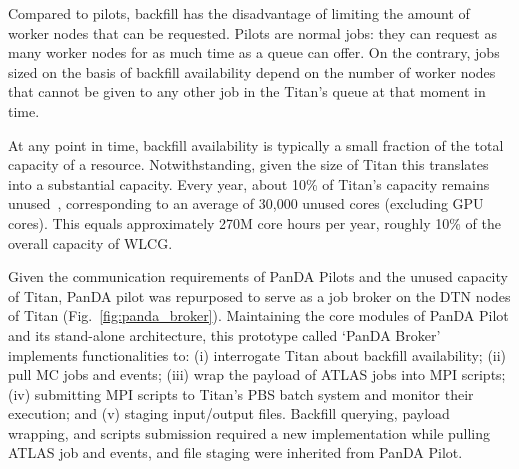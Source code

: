 Compared to pilots, backfill has the disadvantage of limiting the amount of
worker nodes that can be requested. Pilots are normal jobs: they can request as
many worker nodes for as much time as a queue can offer. On the contrary, jobs
sized on the basis of backfill availability depend on the number of worker nodes
that cannot be given to any other job in the Titan's queue at that moment in
time.


At any point in time, backfill availability is typically a small fraction of the
total capacity of a resource. Notwithstanding, given the size of Titan this
translates into a substantial capacity. Every year, about 10\% of Titan's
capacity remains unused~\cite{barker2016us}, corresponding to an average of
30,000 unused cores (excluding GPU cores). This equals approximately 270M core
hours per year, roughly 10\% of the overall capacity of WLCG.



Given the communication requirements of PanDA Pilots and the unused capacity of
Titan, PanDA pilot was repurposed to serve as a job broker on the DTN nodes of
Titan (Fig.~\ref{fig:panda_broker}). Maintaining the core modules of PanDA Pilot
and its stand-alone architecture, this prototype called `PanDA Broker'
implements functionalities to: (i) interrogate Titan about backfill
availability; (ii) pull MC jobs and events; (iii) wrap the payload of ATLAS jobs
into MPI scripts; (iv) submitting MPI scripts to Titan's PBS batch system and
monitor their execution; and (v) staging input/output files. Backfill querying,
payload wrapping, and scripts submission required a new implementation while
pulling ATLAS job and events, and file staging were inherited from PanDA Pilot.

